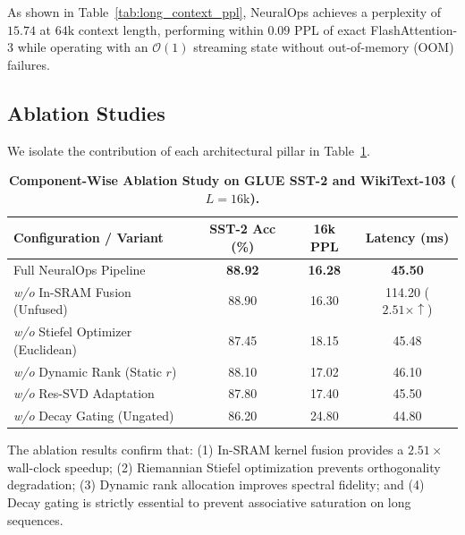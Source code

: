 As shown in Table~\ref{tab:long_context_ppl}, NeuralOps achieves a perplexity of $15.74$ at $64\text{k}$ context length, performing within $0.09$ PPL of exact FlashAttention-3 while operating with an $\mathcal{O}(1)$ streaming state without out-of-memory (OOM) failures.

\subsection{Ablation Studies}
We isolate the contribution of each architectural pillar in Table~\ref{tab:ablation_table}.

\begin{table}[h]
\centering
\small
\caption{\textbf{Component-Wise Ablation Study on GLUE SST-2 and WikiText-103 ($L=16\text{k}$).}}
\label{tab:ablation_table}
\begin{tabularx}{\columnwidth}{lccc}
\toprule
\textbf{Configuration / Variant} & \textbf{SST-2 Acc (\%)} & \textbf{16k PPL} & \textbf{Latency (ms)} \\
\midrule
Full NeuralOps Pipeline & \textbf{88.92} & \textbf{16.28} & \textbf{45.50} \\
\midrule
\textit{w/o} In-SRAM Fusion (Unfused) & 88.90 & 16.30 & 114.20 ($2.51\times \uparrow$) \\
\textit{w/o} Stiefel Optimizer (Euclidean) & 87.45 & 18.15 & 45.48 \\
\textit{w/o} Dynamic Rank (Static $r$) & 88.10 & 17.02 & 46.10 \\
\textit{w/o} Res-SVD Adaptation & 87.80 & 17.40 & 45.50 \\
\textit{w/o} Decay Gating (Ungated) & 86.20 & 24.80 & 44.80 \\
\bottomrule
\end{tabularx}
\end{table}

The ablation results confirm that: (1) In-SRAM kernel fusion provides a $2.51\times$ wall-clock speedup; (2) Riemannian Stiefel optimization prevents orthogonality degradation; (3) Dynamic rank allocation improves spectral fidelity; and (4) Decay gating is strictly essential to prevent associative saturation on long sequences.
